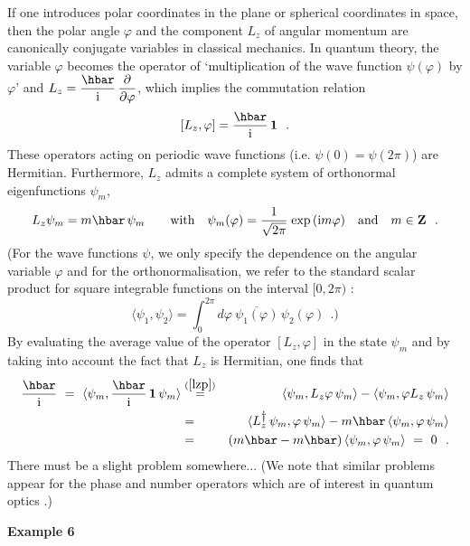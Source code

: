 \documentclass[12pt]{report}
\begin{document}
 If one  introduces polar coordinates in the plane or spherical 
coordinates in space, then the polar angle $\varphi$ 
and the  component $L_z$ of angular momentum 
are canonically conjugate variables in classical mechanics. 
In quantum theory, the variable $\varphi$ becomes the operator 
of `multiplication of the wave function $\psi (\varphi)$ by $\varphi$' 
and $L_z = \ds{\hbar \over \ri} \, \ds{\pa \over \pa \varphi}$,
which implies the commutation relation 
\begin{equation}
\label{lzp}
[ L_z ,  \varphi ] = {\hbar \over \ri} \, {\bf 1}
\ \ .
\end{equation}
These operators acting on periodic wave functions  
(i.e. $\psi (0) = \psi (2\pi)$) are Hermitian. 
Furthermore, $L_z $ admits a complete system of orthonormal 
eigenfunctions $\psi_m$,
\begin{equation}
L_z \psi_m =  m \hbar \, \psi_m
\qquad {\rm with} \quad
\psi_m (\varphi ) = {1 \over \sqrt{2 \pi}} \;
{\rm exp} \, (\ri
m \varphi )
\quad {\rm and} \quad
m \in {\bf Z}
\ \ .
\end{equation}
(For the wave functions $\psi$, we only specify the dependence on the 
angular variable $\varphi$ and for the orthonormalisation, we 
refer to the standard scalar product for square integrable functions 
on the interval $[0, 2\pi )$ :
\[
\langle \psi_1 , \psi_2 \rangle = \int_0^{2 \pi}
d\varphi \ \overline{\psi_1 (\varphi )} \, \psi_2 (\varphi )
\ \ .)
\]
By evaluating the average value of the operator 
$[ L_z ,  \varphi ]$ in the state $\psi_m$ \cite{car,grau}
and by taking into account the fact that 
$L_z $ is Hermitian, one finds that 
\begin{eqnarray}
{\hbar \over \ri} \ = \
\langle \psi_m ,
{\hbar \over \ri} \, {\bf 1} \, \psi_m \rangle
& \stackrel{(\ref{lzp})}{=} &
\langle \psi_m , L_z  \varphi \, \psi_m \rangle -
\langle \psi_m , \varphi L_z \, \psi_m \rangle
\nonumber \\
& = &
\langle L_z ^{\dag} \, \psi_m , \varphi \, \psi_m \rangle -m \hbar
\, \langle \psi_m , \varphi \, \psi_m \rangle
\label{deriv}
\\
& = &
( m \hbar -  m \hbar )
\, \langle \psi_m , \varphi \, \psi_m \rangle
\ = \ 0
\ \ .
\nonumber
\end{eqnarray}
There must be a slight problem somewhere... 
(We note that similar problems appear for the phase 
and number operators which are of interest 
in quantum optics \cite{car,qo}.)

\bigskip
 
 
\noindent 
{\bf Example 6}
 
\end{document}
